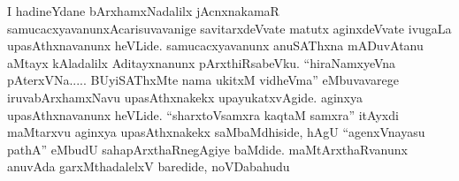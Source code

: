 \begin{artha}
I hadineYdane bArxhamxNadalilx jAcnxnakamaR samucacxyavanunx\break Acarisuvavanige savitarxdeVvate matutx aginxdeVvate ivugaLa upasAthxnavanunx heVLide. samucacxyavanunx anuSAThxna mADuvAtanu aMtayx kAladalilx Aditayxnanunx pArxthiRsabeVku. ``hiraNamxyeVna pAterxVNa..... BUyiSAThxMte nama ukitxM vidheVma'' eMbuvavarege iruva\break bArxhamxNavu upasAthxnakekx upayukatxvAgide. aginxya upasAthxnavanunx heVLide. ``sharxtoVsamxra kaqtaM samxra'' itAyxdi maMtarxvu aginxya upasAthxnakekx saMbaMdhiside, hAgU ``agenxVnayasu pathA'' eMbudU saha\break pArxthaRnegAgiye baMdide. maMtArxthaRvanunx anuvAda garxMthadalelxV baredide, noVDabahudu\ndash 
\end{artha}

\centerline{}
